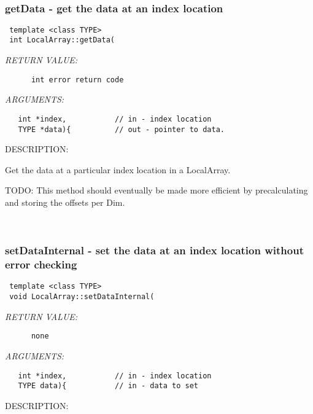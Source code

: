 
\mbox{}\hrulefill\
 
\subsubsection [getData] {getData - get the data at an index location}


  
\begin{verbatim} template <class TYPE>
 int LocalArray::getData(\end{verbatim}{\em RETURN VALUE:}
\begin{verbatim}      int error return code\end{verbatim}{\em ARGUMENTS:}
\begin{verbatim}   int *index,           // in - index location
   TYPE *data){          // out - pointer to data. \end{verbatim}
{\sf DESCRIPTION:\\ }


    Get the data at a particular index location in a LocalArray. 
  
   TODO: This method should eventually be made more efficient by precalculating
          and storing the offsets per Dim. 
   
 
\mbox{}\hrulefill\
 
\subsubsection [setDataInternal] {setDataInternal - set the data at an index location without error checking}


  
\begin{verbatim} template <class TYPE>
 void LocalArray::setDataInternal(\end{verbatim}{\em RETURN VALUE:}
\begin{verbatim}      none\end{verbatim}{\em ARGUMENTS:}
\begin{verbatim}   int *index,           // in - index location
   TYPE data){           // in - data to set \end{verbatim}
{\sf DESCRIPTION:\\ }


